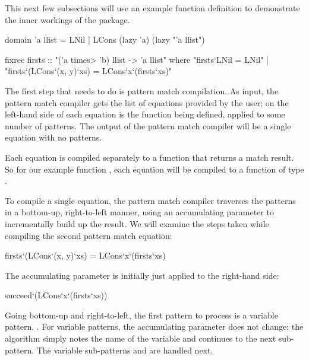 This next few subsections will use an example function definition to demonstrate the inner workings of the {\fixrec} package.
%
\begin{isacode}
domain 'a llist = LNil | LCons (lazy 'a) (lazy "'a llist")
\end{isacode}
\unmedskip
{}
\begin{isacode}
fixrec firsts :: "('a \<times> 'b) llist -> 'a llist"
  where "firsts`LNil = LNil" | "firsts`(LCons`(x, y)`xs) = LCons`x`(firsts`xs)"
\end{isacode}
%
The first step that {\fixrec} needs to do is pattern match compilation. As input, the pattern match compiler gets the list of equations provided by the user; on the left-hand side of each equation is the function being defined, applied to some number of patterns. The output of the pattern match compiler will be a single equation with no patterns.

Each equation is compiled separately to a function that returns a match result. So for our example function , each equation will be compiled to a function of type .

To compile a single equation, the pattern match compiler traverses the patterns in a bottom-up, right-to-left manner, using an accumulating parameter to incrementally build up the result. We will examine the steps taken while compiling the second pattern match equation:
%
\begin{isacode}
firsts`(LCons`(x, y)`xs) = LCons`x`(firsts`xs)
\end{isacode}
%
The accumulating parameter is initially just 
applied to the right-hand side:
%
\begin{isacode}
succeed`(LCons`x`(firsts`xs))
\end{isacode}
%
Going bottom-up and right-to-left, the first pattern to process is a variable pattern, . For variable patterns, the accumulating parameter does not change; the algorithm simply notes the name of the variable and continues to the next sub-pattern. The variable sub-patterns  and  are handled next.

